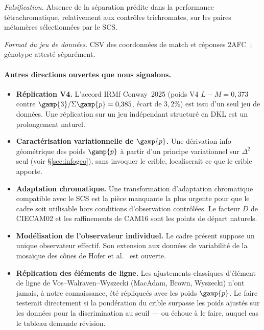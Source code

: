 \documentclass[12pt,a4paper]{article}
\begin{document}
\emph{Falsification.} Absence de la s\'eparation pr\'edite dans la
performance t\'etrachromatique, relativement aux contr\^oles
trichromates, sur les paires m\'etam\`eres s\'electionn\'ees par le SCS.

\emph{Format du jeu de donn\'ees.} CSV des coordonn\'ees de match et
r\'eponses 2AFC~; g\'enotype attest\'e s\'epar\'ement.

\paragraph{Autres directions ouvertes que nous signalons.}
\begin{itemize}[nosep]
\item \textbf{R\'eplication V4.} L'accord IRMf Conway~2025
  (poids V4 $L{-}M = 0{,}373$ contre
  $\gamp{3}/\Sigma \gamp{p} = 0{,}385$, \'ecart de $3{,}2\%$) est
  issu d'un seul jeu de donn\'ees. Une r\'eplication sur un jeu
  ind\'ependant structur\'e en DKL est un prolongement naturel.
\item \textbf{Caract\'erisation variationnelle de $\gamp{p}$.} Une
  d\'erivation info-g\'eom\'etrique des poids $\gamp{p}$ \`a partir
  d'un principe variationnel sur $\Delta^2$ seul (voir
  \S\ref{sec:infogeo}), sans invoquer le crible, localiserait ce que
  le crible apporte.
\item \textbf{Adaptation chromatique.} Une transformation
  d'adaptation chromatique compatible avec le SCS est la pi\`ece
  manquante la plus urgente pour que le cadre soit utilisable
  hors conditions d'observation contr\^ol\'ees. Le facteur $D$ de
  CIECAM02 et les raffinements de CAM16 sont les points de d\'epart
  naturels.
\item \textbf{Mod\'elisation de l'observateur individuel.} Le cadre
  pr\'esent suppose un unique observateur effectif. Son extension
  aux donn\'ees de variabilit\'e de la mosa\"ique des c\^ones de
  Hofer et al.~\cite{hofer2005} est ouverte.
\item \textbf{R\'eplication des \'el\'ements de ligne.} Les
  ajustements classiques d'\'el\'ement de ligne de
  Vos--Walraven--Wyszecki (MacAdam, Brown, Wyszecki) n'ont jamais,
  \`a notre connaissance, \'et\'e r\'eplique\'es avec les poids
  $\gamp{p}$. Le faire testerait directement si la pond\'eration du
  crible surpasse les poids ajust\'es sur les donn\'ees pour la
  discrimination au seuil --- ou \'echoue \`a le faire, auquel cas le
  tableau demande r\'evision.
\end{itemize}
\end{document}
